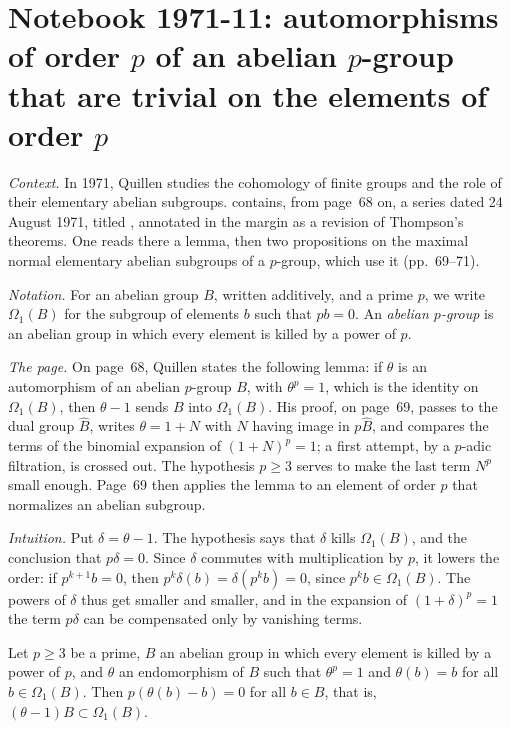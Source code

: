 \section[Notebook 1971-11: automorphisms of order $p$ trivial on $\Omega_1$]{Notebook 1971-11: automorphisms of order $p$ of an abelian $p$-group that are trivial on the elements of order $p$\protect\piste\protect{}}\label{sec:quillen-1971-11}

\emph{Context.} In 1971, Quillen studies the cohomology of finite groups and the role of their elementary abelian subgroups.  contains, from page~68 on, a series dated 24 August 1971, titled , annotated in the margin as a revision of Thompson's theorems. One reads there a lemma, then two propositions on the maximal normal elementary abelian subgroups of a $p$-group, which use it (pp.~69--71).

\emph{Notation.} For an abelian group $B$, written additively, and a prime $p$, we write $\Omega_1(B)$ for the subgroup of elements $b$ such that $pb = 0$. An \emph{abelian $p$-group} is an abelian group in which every element is killed by a power of $p$.

\emph{The page.} On page~68, Quillen states the following lemma: if $\theta$ is an automorphism of an abelian $p$-group $B$, with $\theta^p = 1$, which is the identity on $\Omega_1(B)$, then $\theta - 1$ sends $B$ into $\Omega_1(B)$. His proof, on page~69, passes to the dual group $\widehat B$, writes $\theta = 1 + N$ with $N$ having image in $p\widehat B$, and compares the terms of the binomial expansion of $(1 + N)^p = 1$; a first attempt, by a $p$-adic filtration, is crossed out. The hypothesis $p \ge 3$ serves to make the last term $N^p$ small enough. Page~69 then applies the lemma to an element of order $p$ that normalizes an abelian subgroup.

\emph{Intuition.} Put $\delta = \theta - 1$. The hypothesis says that $\delta$ kills $\Omega_1(B)$, and the conclusion that $p\delta = 0$. Since $\delta$ commutes with multiplication by $p$, it lowers the order: if $p^{k+1} b = 0$, then $p^k \delta(b) = \delta(p^k b) = 0$, since $p^k b \in \Omega_1(B)$. The powers of $\delta$ thus get smaller and smaller, and in the expansion of $(1 + \delta)^p = 1$ the term $p\delta$ can be compensated only by vanishing terms.

\begin{encadre}
\begin{theoreme}\label{thm:quillen-1971-11}
Let $p \ge 3$ be a prime, $B$ an abelian group in which every element is killed by a power of $p$, and $\theta$ an endomorphism of $B$ such that $\theta^p = 1$ and $\theta(b) = b$ for all $b \in \Omega_1(B)$. Then $p(\theta(b) - b) = 0$ for all $b \in B$, that is, $(\theta - 1)B \subset \Omega_1(B)$.
\end{theoreme}
\end{encadre}

